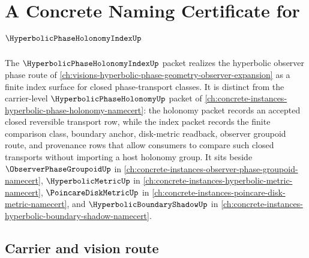 \chapter{A Concrete Naming Certificate for $\HyperbolicPhaseHolonomyIndexUp$}
\label{ch:concrete-instances-hyperbolic-phase-holonomy-index-namecert}

The $\HyperbolicPhaseHolonomyIndexUp$ packet realizes the hyperbolic observer phase route of \autoref{ch:visions-hyperbolic-phase-geometry-observer-expansion} as a finite index surface for closed phase-transport classes. It is distinct from the carrier-level $\HyperbolicPhaseHolonomyUp$ packet of \autoref{ch:concrete-instances-hyperbolic-phase-holonomy-namecert}: the holonomy packet records an accepted closed reversible transport row, while the index packet records the finite comparison class, boundary anchor, disk-metric readback, observer groupoid route, and provenance rows that allow consumers to compare such closed transports without importing a host holonomy group. It sits beside $\ObserverPhaseGroupoidUp$ in \autoref{ch:concrete-instances-observer-phase-groupoid-namecert}, $\HyperbolicMetricUp$ in \autoref{ch:concrete-instances-hyperbolic-metric-namecert}, $\PoincareDiskMetricUp$ in \autoref{ch:concrete-instances-poincare-disk-metric-namecert}, and $\HyperbolicBoundaryShadowUp$ in \autoref{ch:concrete-instances-hyperbolic-boundary-shadow-namecert}.

\section{Carrier and vision route}
\label{sec:hyperbolic-phase-holonomy-index-carrier}

